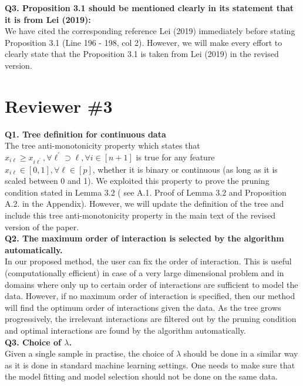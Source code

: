 \documentclass{article}
\begin{document}
\textbf{Q3. Proposition 3.1 should be mentioned clearly in its statement that it is from Lei (2019):}\\

We have cited the corresponding reference Lei (2019) immediately before stating Proposition 3.1 (Line 196 - 198, col 2). However, we will make every effort to clearly state that the Proposition 3.1 is taken from Lei (2019) in the revised version.\\ 



\section*{Reviewer \#3}
\textbf{Q1. Tree definition for continuous data}\\

 The tree anti-monotonicity property which states that $x_{i\ell} \geq x_{i\ell^\prime}, \forall \ell^\prime \supset \ell, \forall i \in [n+1]$ is true for any feature $x_{i \ell} \in [0,1], \forall \ell \in [p]$, whether it is binary or continuous (as long as it is scaled between 0 and 1). We exploited this property to prove the pruning condition stated in Lemma 3.2 ( see A.1. Proof of Lemma 3.2 and Proposition A.2. in the Appendix). However, we will update the definition of the tree and include this tree anti-monotonicity property in the main text of the revised version of the paper.\\


\textbf{Q2. The maximum order of interaction is selected by the algorithm automatically.}\\

In our proposed method, the user can fix the order of interaction. This is useful (computationally efficient) in case of a very large dimensional problem and in domains where only up to certain order of interactions are sufficient to model the data. However, if no maximum order of interaction is specified, then our method will find the optimum order of interactions given the data. As the tree grows progressively, the irrelevant interactions are filtered out by the pruning condition and optimal interactions are found by the algorithm automatically.\\  

\textbf{Q3. Choice of $\lambda$.}\\

Given a single sample in practise, the choice of $\lambda$ should be done in a similar way as it is done in standard machine learning settings. One needs to make sure that the model fitting and model selection should not be done on the same data.\\
\end{document}
